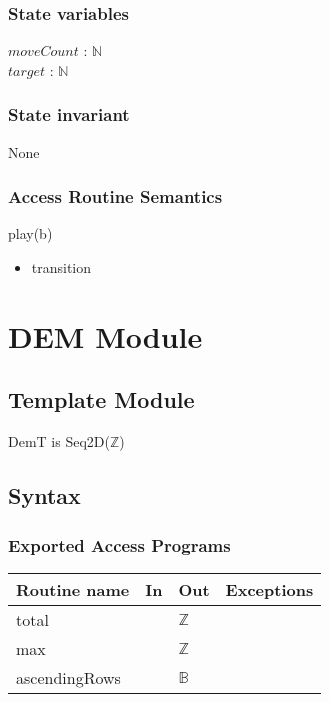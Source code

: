 \documentclass[12pt]{article}
\begin{document}
\subsubsection* {State variables}
\noindent $moveCount$ : $\mathbb{N}$\\
\noindent $target$ : $\mathbb{N}$\\


\subsubsection*{State invariant}
\noindent None

\subsubsection* {Access Routine Semantics}

\noindent play(b)
\begin{itemize}
\item transition
\end{itemize}

\newpage




\section* {DEM Module}

\subsection* {Template Module}

DemT is Seq2D($\mathbb{Z}$)

\subsection* {Syntax}

\subsubsection* {Exported Access Programs}

\begin{tabular}{| l | l | l | p{6cm} |}
\hline
\textbf{Routine name} & \textbf{In} & \textbf{Out} & \textbf{Exceptions}\\
\hline
total & & $\mathbb{Z}$ & \\
\hline
max &  & $\mathbb{Z}$ & \\
\hline
ascendingRows & & $\mathbb{B}$ & \\
\hline
\end{tabular}
\end{document}
